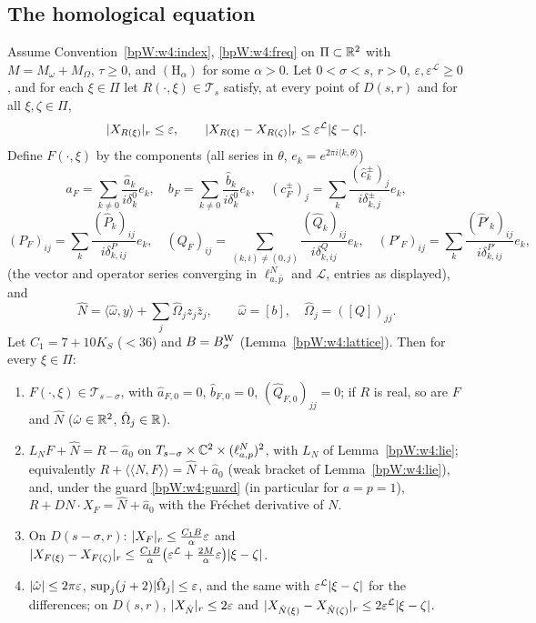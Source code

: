 \subsection{The homological equation}\label{bpW:w4:main-sec}

\begin{theorem}\label{bpW:w4:lemma1}
Assume Convention~\ref{bpW:w4:index}, \eqref{bpW:w4:freq} on $\Pi\subset\mathbb{R}^2$ with $M=M_\omega+M_\Omega$, $\tau\ge0$, and
$(\mathrm H_\alpha)$ for some $\alpha>0$. Let $0<\sigma<s$, $r>0$, $\varepsilon,\varepsilon^{\mathcal L}\ge0$, and for each
$\xi\in\Pi$ let $R(\cdot,\xi)\in\mathcal T_s$ satisfy, at every point of $D(s,r)$ and for all $\xi,\zeta\in\Pi$,
\[\lvert X_{R(\xi)}\rvert_r\le\varepsilon,\qquad\lvert X_{R(\xi)}-X_{R(\zeta)}\rvert_r\le\varepsilon^{\mathcal L}\lvert \xi-\zeta\rvert.\]
Define $F(\cdot,\xi)$ by the components (all series in $\theta$, $e_k=e^{2\pi i\langle k,\theta\rangle}$)
\[a_F=\sum_{k\ne0}\frac{\hat a_k}{i\delta^0_k}e_k,\quad b_F=\sum_{k\ne0}\frac{\hat b_k}{i\delta^0_k}e_k,\quad
(c^\pm_F)_j=\sum_k\frac{(\hat c^\pm_k)_j}{i\delta^\pm_{k,j}}e_k,\]
\[(P_F)_{ij}=\sum_k\frac{(\hat P_k)_{ij}}{i\delta^P_{k,ij}}e_k,\quad(Q_F)_{ij}=\sum_{(k,i)\ne(0,j)}\frac{(\hat Q_k)_{ij}}{i\delta^Q_{k,ij}}e_k,\quad
(P'_F)_{ij}=\sum_k\frac{(\hat P'_k)_{ij}}{i\delta^{P'}_{k,ij}}e_k,\]
(the vector and operator series converging in $\ell^N_{a,\bar p}$ and $\mathcal L$, entries as displayed), and
\[\hat N=\langle\hat\omega,y\rangle+\sum_j\hat\Omega_jz_j\bar z_j,\qquad\hat\omega=[b],\quad\hat\Omega_j=([Q])_{jj}.\]
Let $C_1=7+10K_S$ ($<36$) and $B=B^{\rm W}_\sigma$ (Lemma~\ref{bpW:w4:lattice}). Then for every $\xi\in\Pi$:
\begin{enumerate}[label=(\roman*)]
\item $F(\cdot,\xi)\in\mathcal T_{s-\sigma}$, with $\hat a_{F,0}=0$, $\hat b_{F,0}=0$, $(\hat Q_{F,0})_{jj}=0$; if $R$ is real,
  so are $F$ and $\hat N$ ($\hat\omega\in\mathbb{R}^2$, $\hat\Omega_j\in\mathbb{R}$).
\item $L_NF+\hat N=R-\hat a_0$ on $T_{s-\sigma}\times\mathbb{C}^2\times(\ell^N_{a,p})^2$, with $L_N$ of Lemma~\ref{bpW:w4:lie};
  equivalently $R+\langle\!\langle N,F\rangle\!\rangle=\hat N+\hat a_0$ (weak bracket of Lemma~\ref{bpW:w4:lie}), and, under
  the guard \eqref{bpW:w4:guard} (in particular for $a=p=1$), $R+DN\cdot X_F=\hat N+\hat a_0$ with the Fr\'echet derivative of $N$.
\item On $D(s-\sigma,r)$: $\lvert X_F\rvert_r\le\frac{C_1B}{\alpha}\varepsilon$ and
  $\lvert X_{F(\xi)}-X_{F(\zeta)}\rvert_r\le\frac{C_1B}{\alpha}\bigl(\varepsilon^{\mathcal L}+\frac{2M}{\alpha}\varepsilon\bigr)\lvert \xi-\zeta\rvert$.
\item $\lvert \hat\omega\rvert\le2\pi\varepsilon$, $\sup_j(j+2)\lvert \hat\Omega_j\rvert\le\varepsilon$, and the same with
  $\varepsilon^{\mathcal L}\lvert \xi-\zeta\rvert$ for the differences; on $D(s,r)$, $\lvert X_{\hat N}\rvert_r\le2\varepsilon$ and
  $\lvert X_{\hat N(\xi)}-X_{\hat N(\zeta)}\rvert_r\le2\varepsilon^{\mathcal L}\lvert \xi-\zeta\rvert$.
\end{enumerate}
\end{theorem}


